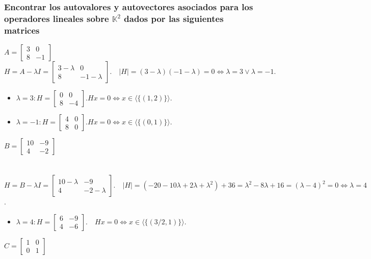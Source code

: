 \documentclass{article}
\begin{document}
\subsubsection{Encontrar los autovalores y autovectores asociados para los operadores lineales sobre $\mathbb{K}^2$ dados por las
siguientes matrices}
$A = \begin{bmatrix} 3&0\\8&-1\end{bmatrix}$ \\
$H = A - \lambda I = \begin{bmatrix} 3-\lambda & 0 \\ 8 & -1-\lambda \end{bmatrix}.
\quad |H| = (3-\lambda)(-1-\lambda) = 0 \Longleftrightarrow \lambda = 3 \vee \lambda = -1.$
\begin{itemize}
\item
	$\lambda = 3: H = \begin{bmatrix} 0&0\\8&-4 \end{bmatrix}. Hx = 0 \Longleftrightarrow x \in \langle \{ (1,2) \} \rangle$.
\item
	$\lambda = -1: H = \begin{bmatrix} 4&0\\8&0\end{bmatrix}. Hx = 0 \Longleftrightarrow x \in \langle \{ (0,1) \} \rangle$.
\end{itemize}
$B = \begin{bmatrix} 10&-9\\4&-2 \end{bmatrix}$ \\ \\ \\
$H = B - \lambda I =  \begin{bmatrix} 10-\lambda&-9\\4&-2-\lambda \end{bmatrix}.\quad |H| = (-20-10\lambda+2\lambda+\lambda^2)+
36 = \lambda^2-8\lambda+16 = (\lambda -4)^2 = 0 \Longleftrightarrow \lambda = 4$.
\begin{itemize}
\item
	$\lambda = 4: H = \begin{bmatrix} 6&-9\\4&-6\end{bmatrix}. \quad Hx = 0 \Longleftrightarrow x \in \langle \{ (3/2,1) \} \rangle$.
\end{itemize}
$C = \begin{bmatrix} 1&0\\0&1\end{bmatrix}$ \\ \\
\end{document}
